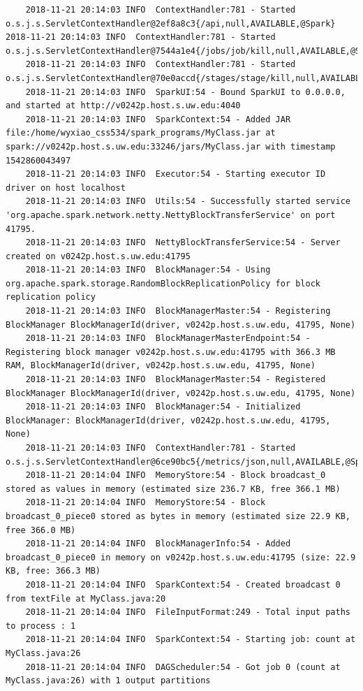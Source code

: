 \documentclass[11pt, letterpaper]{article}
\begin{document}
\begin{lstlisting}
	2018-11-21 20:14:03 INFO  ContextHandler:781 - Started o.s.j.s.ServletContextHandler@2ef8a8c3{/api,null,AVAILABLE,@Spark} 2018-11-21 20:14:03 INFO  ContextHandler:781 - Started o.s.j.s.ServletContextHandler@7544a1e4{/jobs/job/kill,null,AVAILABLE,@Spark}
	2018-11-21 20:14:03 INFO  ContextHandler:781 - Started o.s.j.s.ServletContextHandler@70e0accd{/stages/stage/kill,null,AVAILABLE,@Spark}
	2018-11-21 20:14:03 INFO  SparkUI:54 - Bound SparkUI to 0.0.0.0, and started at http://v0242p.host.s.uw.edu:4040
	2018-11-21 20:14:03 INFO  SparkContext:54 - Added JAR file:/home/wyxiao_css534/spark_programs/MyClass.jar at spark://v0242p.host.s.uw.edu:33246/jars/MyClass.jar with timestamp 1542860043497
	2018-11-21 20:14:03 INFO  Executor:54 - Starting executor ID driver on host localhost
	2018-11-21 20:14:03 INFO  Utils:54 - Successfully started service 'org.apache.spark.network.netty.NettyBlockTransferService' on port 41795.
	2018-11-21 20:14:03 INFO  NettyBlockTransferService:54 - Server created on v0242p.host.s.uw.edu:41795
	2018-11-21 20:14:03 INFO  BlockManager:54 - Using org.apache.spark.storage.RandomBlockReplicationPolicy for block replication policy
	2018-11-21 20:14:03 INFO  BlockManagerMaster:54 - Registering BlockManager BlockManagerId(driver, v0242p.host.s.uw.edu, 41795, None)
	2018-11-21 20:14:03 INFO  BlockManagerMasterEndpoint:54 - Registering block manager v0242p.host.s.uw.edu:41795 with 366.3 MB RAM, BlockManagerId(driver, v0242p.host.s.uw.edu, 41795, None)
	2018-11-21 20:14:03 INFO  BlockManagerMaster:54 - Registered BlockManager BlockManagerId(driver, v0242p.host.s.uw.edu, 41795, None)
	2018-11-21 20:14:03 INFO  BlockManager:54 - Initialized BlockManager: BlockManagerId(driver, v0242p.host.s.uw.edu, 41795, None)
	2018-11-21 20:14:03 INFO  ContextHandler:781 - Started o.s.j.s.ServletContextHandler@6ce90bc5{/metrics/json,null,AVAILABLE,@Spark}
	2018-11-21 20:14:04 INFO  MemoryStore:54 - Block broadcast_0 stored as values in memory (estimated size 236.7 KB, free 366.1 MB)
	2018-11-21 20:14:04 INFO  MemoryStore:54 - Block broadcast_0_piece0 stored as bytes in memory (estimated size 22.9 KB, free 366.0 MB)
	2018-11-21 20:14:04 INFO  BlockManagerInfo:54 - Added broadcast_0_piece0 in memory on v0242p.host.s.uw.edu:41795 (size: 22.9 KB, free: 366.3 MB)
	2018-11-21 20:14:04 INFO  SparkContext:54 - Created broadcast 0 from textFile at MyClass.java:20
	2018-11-21 20:14:04 INFO  FileInputFormat:249 - Total input paths to process : 1
	2018-11-21 20:14:04 INFO  SparkContext:54 - Starting job: count at MyClass.java:26
	2018-11-21 20:14:04 INFO  DAGScheduler:54 - Got job 0 (count at MyClass.java:26) with 1 output partitions

\end{lstlisting}
\end{document}
